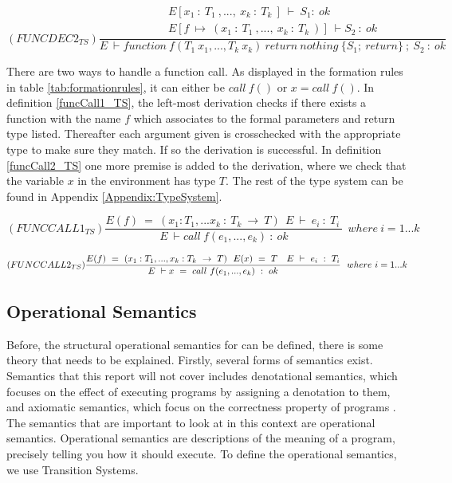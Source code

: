 \begin{equation} \label{funcDec2_TS}
(FUNCDEC2_{TS})\frac{\begin{array}{c} E[x_1 \ : \ T_1 \ , ... , \ x_k \ : \ T_k \ ] \ \vdash \ S_1 : \ ok \ \\
E[f \ \mapsto \ 
(x_1 \ : \ T_1 \ , ... , \ x_k \ : 
\ T_k \ )] \ \vdash S_2 \ : \ ok\end{array}  }
{E \ \vdash function \ f(T_1\ x_1 , ... , T_k\ x_k) 
\ return \ nothing \ \{ S_1 ; \ return \}\ ;\ S_2 \ : \ ok}
\end{equation}

\noindent There are two ways to handle a function call. As displayed in the formation rules in table \ref{tab:formationrules}, it can either be $call \ f()$ or $x = call \ f()$. In definition \ref{funcCall1_TS}, the left-most derivation checks if there exists a function with the name $f$ which associates to the formal parameters and return type listed. Thereafter each argument given is crosschecked with the appropriate type to make sure they match. If so the derivation is successful. In definition \ref{funcCall2_TS} one more premise is added to the derivation, where we check that the variable $x$ in the environment has type $T$. The rest of the type system can be found in Appendix \ref{Appendix:TypeSystem}.

\begin{equation} \label{funcCall1_TS}
      (FUNCCALL1_{TS})\frac{E(f)\ =\ (x_1: T_1 ,...x_k\ :\ T_k\ \rightarrow\ T) \ \ E \ \vdash \ e_i \ : \ T_i \ }
{E \ \vdash call \ f(e_1,...,e_k) \ : \ ok} \ \ where \ i = 1...k
\end{equation}

\begin{equation}\label{funcCall2_TS}
     (FUNCCALL2_{TS})\frac{E(f)\ =\ (x_1: T_1 ,..., x_k : T_k\ \rightarrow\ T) \ \ E(x)\ = \  T \ \ \ E \ \vdash \ e_i \ : \ T_i \\ }{E \ \vdash x \ = \ call\ f(e_1,...,e_k) \ : \ ok} \ \ where \ i = 1...k
\end{equation}

\subsection{Operational Semantics} \label{operational_Semantics}
Before, the structural operational semantics for \lang can be defined, there is some theory that needs to be explained. Firstly, several forms of semantics exist. Semantics that this report will not cover includes denotational semantics, which focuses on the effect of executing programs by assigning a denotation to them, and axiomatic semantics, which focus on the correctness property of programs \cite{SS_lecture_8}. The semantics that are important to look at in this context are operational semantics. Operational semantics are descriptions of the meaning of a program, precisely telling you how it should execute. To define the operational semantics, we use Transition Systems.

